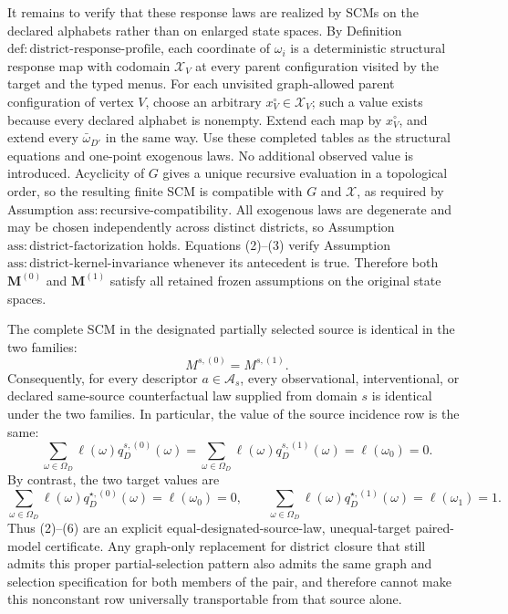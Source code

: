 It remains to verify that these response laws are realized by SCMs on the declared alphabets rather than on enlarged state spaces.  By Definition \(\mathrm{def:district\text{-}response\text{-}profile}\), each coordinate of \(\omega_i\) is a deterministic structural response map with codomain \(\mathcal X_V\) at every parent configuration visited by the target and the typed menus.  For each unvisited graph-allowed parent configuration of vertex \(V\), choose an arbitrary \(x_V^\circ\in\mathcal X_V\); such a value exists because every declared alphabet is nonempty.  Extend each map by \(x_V^\circ\), and extend every \(\bar\omega_{D'}\) in the same way.  Use these completed tables as the structural equations and one-point exogenous laws.  No additional observed value is introduced.  Acyclicity of \(G\) gives a unique recursive evaluation in a topological order, so the resulting finite SCM is compatible with \(G\) and \(\mathcal X\), as required by Assumption \(\mathrm{ass:recursive\text{-}compatibility}\).  All exogenous laws are degenerate and may be chosen independently across distinct districts, so Assumption \(\mathrm{ass:district\text{-}factorization}\) holds.  Equations (2)--(3) verify Assumption \(\mathrm{ass:district\text{-}kernel\text{-}invariance}\) whenever its antecedent is true.  Therefore both \(\mathbf M^{(0)}\) and \(\mathbf M^{(1)}\) satisfy all retained frozen assumptions on the original state spaces.

The complete SCM in the designated partially selected source is identical in the two families:
\[
M^{s,(0)}=M^{s,(1)}.
\tag{4}
\]
Consequently, for every descriptor \(a\in\mathcal A_s\), every observational, interventional, or declared same-source counterfactual law supplied from domain \(s\) is identical under the two families.  In particular, the value of the source incidence row is the same:
\[
\sum_{\omega\in\Omega_D}\ell(\omega)q_D^{s,(0)}(\omega)
=
\sum_{\omega\in\Omega_D}\ell(\omega)q_D^{s,(1)}(\omega)
=\ell(\omega_0)=0.
\tag{5}
\]
By contrast, the two target values are
\[
\sum_{\omega\in\Omega_D}\ell(\omega)q_D^{\star,(0)}(\omega)
=\ell(\omega_0)=0,
\qquad
\sum_{\omega\in\Omega_D}\ell(\omega)q_D^{\star,(1)}(\omega)
=\ell(\omega_1)=1.
\tag{6}
\]
Thus (2)--(6) are an explicit equal-designated-source-law, unequal-target paired-model certificate.  Any graph-only replacement for district closure that still admits this proper partial-selection pattern also admits the same graph and selection specification for both members of the pair, and therefore cannot make this nonconstant row universally transportable from that source alone.

